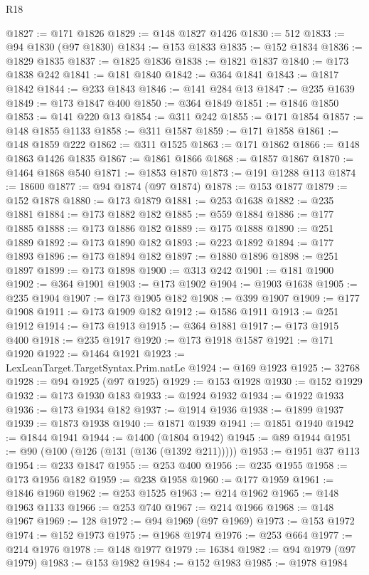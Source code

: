 \begin{lexlean}{R18}
\begin{coremodule}
@1827 := @171 @1826
@1829 := @148 @1827 @1426
@1830 := 512
@1833 := @94 @1830 (@97 @1830)
@1834 := @153 @1833
@1835 := @152 @1834
@1836 := @1829 @1835
@1837 := @1825 @1836
@1838 := @1821 @1837
@1840 := @173 @1838 @242
@1841 := @181 @1840
@1842 := @364 @1841
@1843 := @1817 @1842
@1844 := @233 @1843
@1846 := @141 @284 @13
@1847 := @235 @1639
@1849 := @173 @1847 @400
@1850 := @364 @1849
@1851 := @1846 @1850
@1853 := @141 @220 @13
@1854 := @311 @242
@1855 := @171 @1854
@1857 := @148 @1855 @1133
@1858 := @311 @1587
@1859 := @171 @1858
@1861 := @148 @1859 @222
@1862 := @311 @1525
@1863 := @171 @1862
@1866 := @148 @1863 @1426 @1835
@1867 := @1861 @1866
@1868 := @1857 @1867
@1870 := @1464 @1868 @540
@1871 := @1853 @1870
@1873 := @191 @1288 @113
@1874 := 18600
@1877 := @94 @1874 (@97 @1874)
@1878 := @153 @1877
@1879 := @152 @1878
@1880 := @173 @1879
@1881 := @253 @1638
@1882 := @235 @1881
@1884 := @173 @1882 @182
@1885 := @559 @1884
@1886 := @177 @1885
@1888 := @173 @1886 @182
@1889 := @175 @1888
@1890 := @251 @1889
@1892 := @173 @1890 @182
@1893 := @223 @1892
@1894 := @177 @1893
@1896 := @173 @1894 @182
@1897 := @1880 @1896
@1898 := @251 @1897
@1899 := @173 @1898
@1900 := @313 @242
@1901 := @181 @1900
@1902 := @364 @1901
@1903 := @173 @1902
@1904 := @1903 @1638
@1905 := @235 @1904
@1907 := @173 @1905 @182
@1908 := @399 @1907
@1909 := @177 @1908
@1911 := @173 @1909 @182
@1912 := @1586 @1911
@1913 := @251 @1912
@1914 := @173 @1913
@1915 := @364 @1881
@1917 := @173 @1915 @400
@1918 := @235 @1917
@1920 := @173 @1918 @1587
@1921 := @171 @1920
@1922 := @1464 @1921
@1923 := LexLeanTarget.TargetSyntax.Prim.natLe
@1924 := @169 @1923
@1925 := 32768
@1928 := @94 @1925 (@97 @1925)
@1929 := @153 @1928
@1930 := @152 @1929
@1932 := @173 @1930 @183
@1933 := @1924 @1932
@1934 := @1922 @1933
@1936 := @173 @1934 @182
@1937 := @1914 @1936
@1938 := @1899 @1937
@1939 := @1873 @1938
@1940 := @1871 @1939
@1941 := @1851 @1940
@1942 := @1844 @1941
@1944 := @1400 (@1804 @1942)
@1945 := @89 @1944
@1951 := @90 (@100 (@126 (@131 (@136 (@1392 @211)))))
@1953 := @1951 @37 @113
@1954 := @233 @1847
@1955 := @253 @400
@1956 := @235 @1955
@1958 := @173 @1956 @182
@1959 := @238 @1958
@1960 := @177 @1959
@1961 := @1846 @1960
@1962 := @253 @1525
@1963 := @214 @1962
@1965 := @148 @1963 @1133
@1966 := @253 @740
@1967 := @214 @1966
@1968 := @148 @1967
@1969 := 128
@1972 := @94 @1969 (@97 @1969)
@1973 := @153 @1972
@1974 := @152 @1973
@1975 := @1968 @1974
@1976 := @253 @664
@1977 := @214 @1976
@1978 := @148 @1977
@1979 := 16384
@1982 := @94 @1979 (@97 @1979)
@1983 := @153 @1982
@1984 := @152 @1983
@1985 := @1978 @1984

\end{coremodule}
\end{lexlean}
